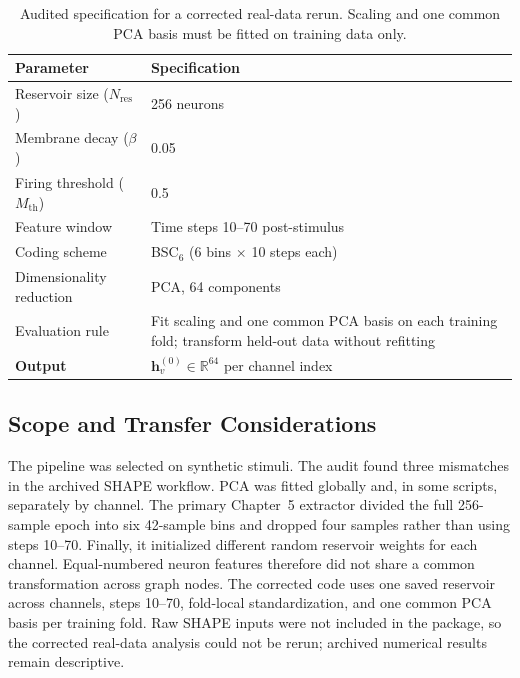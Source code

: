 \begin{table}[H]
    \centering
    \caption{Audited specification for a corrected real-data rerun. Scaling and one common PCA basis must be fitted on training data only.}
    \label{tab:final_embedding_spec}
    \renewcommand{\arraystretch}{1.2}
    \begin{tabular}{|l|p{8cm}|}
        \hline
        \textbf{Parameter} & \textbf{Specification} \\
        \hline
        Reservoir size ($N_{\text{res}}$) & 256 neurons \\
        Membrane decay ($\beta$) & 0.05 \\
        Firing threshold ($M_{\text{th}}$) & 0.5 \\
        Feature window & Time steps 10--70 post-stimulus \\
        Coding scheme & BSC$_6$ (6 bins $\times$ 10 steps each) \\
        Dimensionality reduction & PCA, 64 components \\
        Evaluation rule & Fit scaling and one common PCA basis on each training fold; transform held-out data without refitting \\
        \textbf{Output} & $\mathbf{h}_v^{(0)} \in \mathbb{R}^{64}$ per channel index \\
        \hline
    \end{tabular}
\end{table}

\subsection{Scope and Transfer Considerations}

The pipeline was selected on synthetic stimuli. The audit found three mismatches in the archived SHAPE workflow. PCA was fitted globally and, in some scripts, separately by channel. The primary Chapter~5 extractor divided the full 256-sample epoch into six 42-sample bins and dropped four samples rather than using steps 10--70. Finally, it initialized different random reservoir weights for each channel. Equal-numbered neuron features therefore did not share a common transformation across graph nodes. The corrected code uses one saved reservoir across channels, steps 10--70, fold-local standardization, and one common PCA basis per training fold. Raw SHAPE inputs were not included in the package, so the corrected real-data analysis could not be rerun; archived numerical results remain descriptive.

